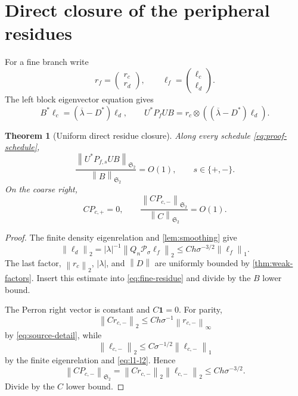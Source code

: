 \documentclass[11pt]{article}
\newtheorem{theorem}{Theorem}[section]
\theoremstyle{remark}
\newcommand{\cP}{\mathcal P}
\newcommand{\HS}{\mathfrak S_2}
\newcommand{\norm}[1]{\left\lVert #1\right\rVert}
\begin{document}
\section{Direct closure of the peripheral residues}

For a fine branch write
\[
 r_f=\begin{pmatrix}r_c\\r_d\end{pmatrix},\qquad
 \ell_f=\begin{pmatrix}\ell_c\\\ell_d\end{pmatrix}.
\]
The left block eigenvector equation gives
\begin{equation}
 B^*\ell_c=(\overline\lambda-D^*)\ell_d,
 \qquad
 U^*P_fUB
 =r_c\otimes((\overline\lambda-D^*)\ell_d).
 \label{eq:fine-residue}
\end{equation}

\begin{theorem}[Uniform direct residue closure]
\label{thm:residue-closure}
Along every schedule \eqref{eq:proof-schedule},
\begin{equation}
 \boxed{
 \frac{\norm{U^*P_{f,s}UB}_{\HS}}{\norm B_{\HS}}
 =O(1),\qquad s\in\{+,-\}.}
 \label{eq:fine-O1}
\end{equation}
On the coarse right,
\begin{equation}
 \boxed{
 CP_{c,+}=0,\qquad
 \frac{\norm{CP_{c,-}}_{\HS}}{\norm C_{\HS}}=O(1).}
 \label{eq:right-O1}
\end{equation}
\end{theorem}

\begin{proof}
The finite density eigenrelation and \cref{lem:smoothing} give
\[
 \norm{\ell_d}_2
 =
 |\lambda|^{-1}\norm{Q_n\cP_\sigma\ell_f}_2
 \le C h\sigma^{-3/2}\norm{\ell_f}_1.
\]
The last factor, \(\norm{r_c}_2\), \(|\lambda|\), and \(\norm D\) are
uniformly bounded by \cref{thm:weak-factors}.  Insert this estimate into
\eqref{eq:fine-residue} and divide by the \(B\) lower bound.

The Perron right vector is constant and \(C\mathbf1=0\).  For parity,
\[
 \norm{Cr_{c,-}}_2
 \le C h\sigma^{-1}\norm{r_{c,-}}_\infty
\]
by \eqref{eq:source-detail}, while
\[
 \norm{\ell_{c,-}}_2
 \le C\sigma^{-1/2}\norm{\ell_{c,-}}_1
\]
by the finite eigenrelation and \eqref{eq:l1-l2}.  Hence
\[
 \norm{CP_{c,-}}_{\HS}
 =\norm{Cr_{c,-}}_2\norm{\ell_{c,-}}_2
 \le C h\sigma^{-3/2}.
\]
Divide by the \(C\) lower bound.
\end{proof}
\end{document}
